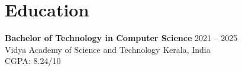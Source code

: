 \documentclass[a4paper,11pt]{article}
\newcommand{\resumeItem}[1]{
    \item #1
}
\newcommand{\resumeProjectEnd}{
    \vspace{4pt}
}
\begin{document}
\resumeProjectEnd







\section*{Education}
\vspace{0.04cm}

\textbf{Bachelor of Technology in Computer Science}
\hfill 2021 -- 2025 \\[2pt]
Vidya Academy of Science and Technology
\hfill Kerala, India \\[2pt]
CGPA: 8.24/10




\end{document}
